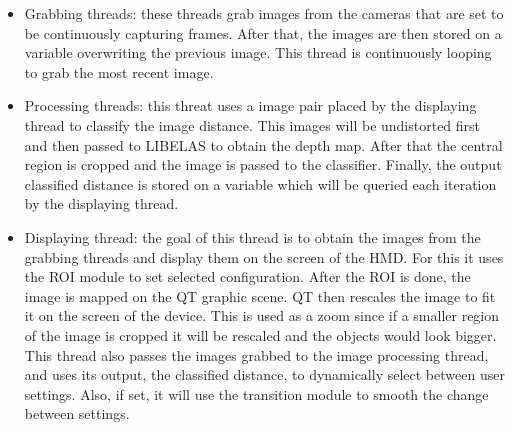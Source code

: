 \documentclass[10pt,a4paper,twocolumn,twoside]{article}
\begin{document}
	\begin{itemize}
		\item Grabbing threads: these threads grab images from the cameras that are set to be continuously capturing frames. After that, the images are then stored on a variable overwriting the previous image. This thread is continuously looping to grab the most recent image.
		
		\item Processing threads: this threat uses a image pair placed by the displaying thread to classify the image distance. This images will be undistorted first and then passed to LIBELAS to obtain the depth map. After that the central region is cropped and the image is passed to the classifier. Finally, the output classified distance is stored on a variable which will be queried each iteration by the displaying thread.  
		
		\item Displaying thread: the goal of this thread is to obtain the images from the grabbing threads and display them on the screen of the HMD. For this it uses the ROI module to set selected configuration. After the ROI is done, the image is mapped on the QT graphic scene. QT then rescales the image to fit it on the screen of the device. This is used as a zoom since if a smaller region of the image is cropped it will be rescaled and the objects would look bigger. This thread also passes the images grabbed to the image processing thread, and uses its output, the classified distance, to dynamically select between user settings. Also, if set, it will use the transition module to smooth the change between settings. 
		
	\end{itemize}
	
\end{document}
